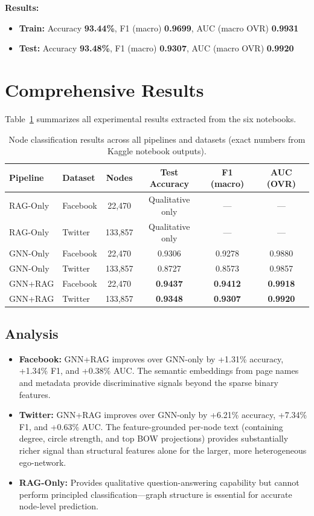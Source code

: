 \documentclass[conference]{IEEEtran}
\begin{document}
\textbf{Results:}
\begin{itemize}
  \item \textbf{Train:} Accuracy \textbf{93.44\%}, F1 (macro) \textbf{0.9699}, AUC (macro OVR) \textbf{0.9931}
  \item \textbf{Test:} Accuracy \textbf{93.48\%}, F1 (macro) \textbf{0.9307}, AUC (macro OVR) \textbf{0.9920}
\end{itemize}

\section{Comprehensive Results}

Table~\ref{tab:results} summarizes all experimental results extracted from the six notebooks.

\begin{table}[t]
\centering
\caption{Node classification results across all pipelines and datasets (exact numbers from Kaggle notebook outputs).}
\label{tab:results}
\begin{tabular}{@{}l l c c c c@{}}
\toprule
Pipeline & Dataset & Nodes & Test Accuracy & F1 (macro) & AUC (OVR) \\
\midrule
RAG-Only & Facebook & 22{,}470 & Qualitative only & --- & --- \\
RAG-Only & Twitter & 133{,}857 & Qualitative only & --- & --- \\
GNN-Only & Facebook & 22{,}470 & 0.9306 & 0.9278 & 0.9880 \\
GNN-Only & Twitter & 133{,}857 & 0.8727 & 0.8573 & 0.9857 \\
GNN+RAG & Facebook & 22{,}470 & \textbf{0.9437} & \textbf{0.9412} & \textbf{0.9918} \\
GNN+RAG & Twitter & 133{,}857 & \textbf{0.9348} & \textbf{0.9307} & \textbf{0.9920} \\
\bottomrule
\end{tabular}
\end{table}

\subsection{Analysis}
\begin{itemize}
  \item \textbf{Facebook:} GNN+RAG improves over GNN-only by +1.31\% accuracy, +1.34\% F1, and +0.38\% AUC. The semantic embeddings from page names and metadata provide discriminative signals beyond the sparse binary features.
  \item \textbf{Twitter:} GNN+RAG improves over GNN-only by +6.21\% accuracy, +7.34\% F1, and +0.63\% AUC. The feature-grounded per-node text (containing degree, circle strength, and top BOW projections) provides substantially richer signal than structural features alone for the larger, more heterogeneous ego-network.
  \item \textbf{RAG-Only:} Provides qualitative question-answering capability but cannot perform principled classification---graph structure is essential for accurate node-level prediction.
\end{itemize}
\end{document}
